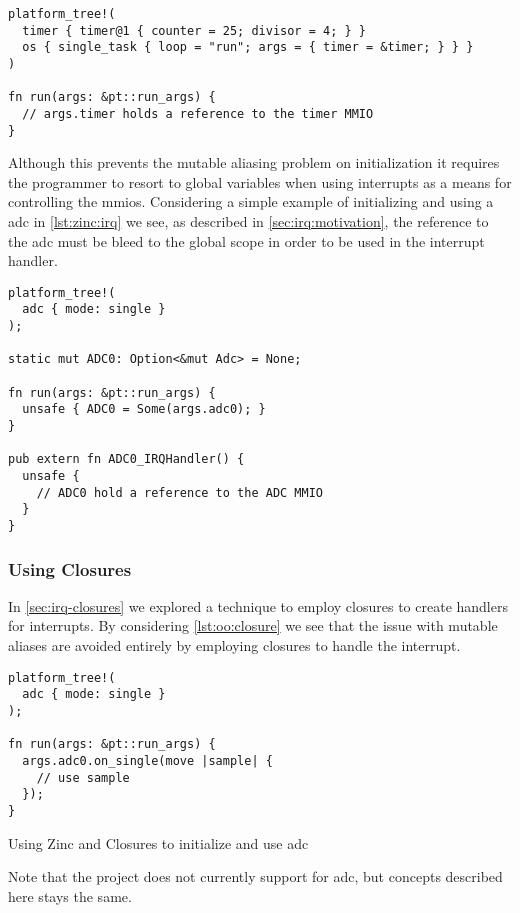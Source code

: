 \begin{listing}[H]
  \begin{verbatim}
platform_tree!(
  timer { timer@1 { counter = 25; divisor = 4; } }
  os { single_task { loop = "run"; args = { timer = &timer; } } }
)

fn run(args: &pt::run_args) {
  // args.timer holds a reference to the timer MMIO
}
  \end{verbatim}
  \caption{}
  \label{lst:zinc:platformtree}
\end{listing}

Although this prevents the mutable aliasing problem on initialization it requires the programmer to resort to global variables when using interrupts as a means for controlling the \glspl{mmio}.
Considering a simple example of initializing and using a \gls{adc} in \autoref{lst:zinc:irq} we see, as described in \autoref{sec:irq:motivation}, the reference to the \gls{adc} must be bleed to the global scope in order to be used in the interrupt handler.

\begin{listing}[H]
  \begin{verbatim}
platform_tree!(
  adc { mode: single }
);

static mut ADC0: Option<&mut Adc> = None;

fn run(args: &pt::run_args) {
  unsafe { ADC0 = Some(args.adc0); }
}

pub extern fn ADC0_IRQHandler() {
  unsafe {
    // ADC0 hold a reference to the ADC MMIO
  }
}
  \end{verbatim}
  \caption{}
  \label{lst:zinc:irq}
\end{listing}

\subsubsection{Using Closures}

In \autoref{sec:irq-closures} we explored a technique to employ closures to create handlers for interrupts.
By considering \autoref{lst:oo:closure} we see that the issue with mutable aliases are avoided entirely by employing closures to handle the interrupt.

\begin{listing}[H]
  \begin{verbatim}
platform_tree!(
  adc { mode: single }
);

fn run(args: &pt::run_args) {
  args.adc0.on_single(move |sample| {
    // use sample
  });
}
  \end{verbatim}
  \caption{Using Zinc and Closures to initialize and use \gls{adc}}
  \label{lst:oo:closure}
\end{listing}

Note that the  project does not currently support for \gls{adc}, but concepts described here stays the same.
